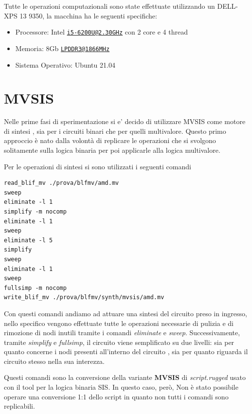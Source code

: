 \documentclass[italian,]{book}
\providecommand{\tightlist}{%
  \setlength{\itemsep}{0pt}\setlength{\parskip}{0pt}}
\begin{document}
Tutte le operazioni computazionali sono state effettuate utilizzando un DELL-XPS 13 9350, la macchina ha le seguenti specifiche:

\begin{itemize}
\tightlist
\item
  Processore: Intel \href{mailto:i5-6200U@2.30GHz}{\nolinkurl{i5-6200U@2.30GHz}} con 2 core e 4 thread
\item
  Memoria: 8Gb \href{mailto:LPDDR3@1866MHz}{\nolinkurl{LPDDR3@1866MHz}}
\item
  Sistema Operativo: Ubuntu 21.04
\end{itemize}

\newpage

\hypertarget{mvsis-2}{%
\section{MVSIS}\label{mvsis-2}}

Nelle prime fasi di sperimentazione si e' decido di utilizzare MVSIS come motore di sintesi , sia per i circuiti binari che per quelli multivalore. Questo primo approccio è nato dalla volontà di replicare le operazioni che si svolgono solitamente sulla logica binaria per poi applicarle alla logica multivalore.

Per le operazioni di sintesi si sono utilizzati i seguenti comandi

\begin{verbatim}
read_blif_mv ./prova/blfmv/amd.mv
sweep
eliminate -l 1
simplify -m nocomp
eliminate -l 1
sweep
eliminate -l 5
simplify
sweep
eliminate -l 1
sweep
fullsimp -m nocomp
write_blif_mv ./prova/blfmv/synth/mvsis/amd.mv
\end{verbatim}

Con questi comandi andiamo ad attuare una sintesi del circuito preso in ingresso, nello specifico vengono effettuate tutte le operazioni necessarie di pulizia e di rimozione di nodi inutili tramite i comandi \emph{eliminate} e \emph{sweep}. Successivamente, tramite \emph{simplify} e \emph{fullsimp}, il circuito viene semplificato su due livelli: sia per quanto concerne i nodi presenti all'interno del circuito , sia per quanto riguarda il circuito stesso nella sua interezza.

Questi comandi sono la conversione della variante \textbf{MVSIS} di \emph{script.rugged} usato con il tool per la logica binaria SIS. In questo caso, però, Non è stato possibile operare una conversione 1:1 dello script in quanto non tutti i comandi sono replicabili.
\end{document}
